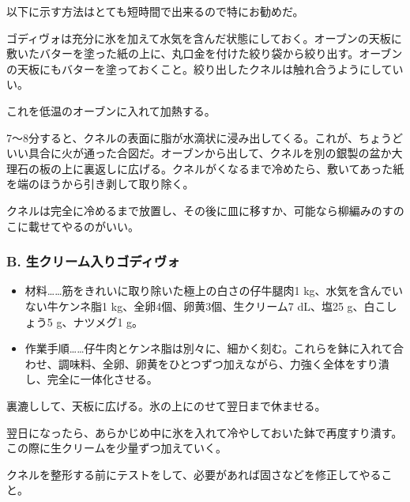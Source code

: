 以下に示す方法はとても短時間で出来るので特にお勧めだ。

ゴディヴォは充分に氷を加えて水気を含んだ状態にしておく。オーブンの天板に敷いたバターを塗った紙の上に、丸口金を付けた絞り袋から絞り出す。オーブンの天板にもバターを塗っておくこと。絞り出したクネルは触れ合うようにしていい。

これを低温のオーブンに入れて加熱する。

7〜8分すると、クネルの表面に脂が水滴状に浸み出してくる。これが、ちょうどいい具合に火が通った合図だ。オーブンから出して、クネルを別の銀製の盆か大理石の板の上に裏返しに広げる。クネルがくなるまで冷めたら、敷いてあった紙を端のほうから引き剥して取り除く。

クネルは完全に冷めるまで放置し、その後に皿に移すか、可能なら柳編みのすのこに載せてやるのがいい。

\hypertarget{godiveau-a-la-creme}{%
\subsubsection{B. 生クリーム入りゴディヴォ}\label{godiveau-a-la-creme}}



\begin{itemize}
\item
  材料\ldots{}\ldots{}筋をきれいに取り除いた極上の白さの仔牛腿肉1
  kg、水気を含んでいない牛ケンネ脂1 kg、全卵4個、卵黄3個、生クリーム7
  dL、塩25 g、白こしょう5 g、ナツメグ1 g。
\item
  作業手順\ldots{}\ldots{}仔牛肉とケンネ脂は別々に、細かく刻む。これらを鉢に入れて合わせ、調味料、全卵、卵黄をひとつずつ加えながら、力強く全体をすり潰し、完全に一体化させる。
\end{itemize}

裏漉しして、天板に広げる。氷の上にのせて翌日まで休ませる。

翌日になったら、あらかじめ中に氷を入れて冷やしておいた鉢で再度すり潰す。この際に生クリームを少量ずつ加えていく。

クネルを整形する前にテストをして、必要があれば固さなどを修正してやること。
